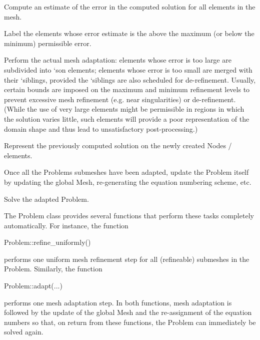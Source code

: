 \begin{DoxyEnumerate}
\item Compute an estimate of the error in the computed solution for all elements in the mesh.
\item Label the elements whose error estimate is the above the maximum (or below the minimum) permissible error.
\item Perform the actual mesh adaptation\+: elements whose error is too large are subdivided into `son\textquotesingle{} elements; elements whose error is too small are merged with their `siblings\textquotesingle{}, provided the `siblings\textquotesingle{} are also scheduled for de-\/refinement. Usually, certain bounds are imposed on the maximum and minimum refinement levels to prevent excessive mesh refinement (e.\+g. near singularities) or de-\/refinement. (While the use of very large elements might be permissible in regions in which the solution varies little, such elements will provide a poor representation of the domain shape and thus lead to unsatisfactory post-\/processing.)
\item Represent the previously computed solution on the newly created {\ttfamily Nodes} / elements.
\item Once all the {\ttfamily Problem\textquotesingle{}s} submeshes have been adapted, update the {\ttfamily Problem} itself by updating the global {\ttfamily Mesh}, re-\/generating the equation numbering scheme, etc.
\item Solve the adapted {\ttfamily Problem}.
\end{DoxyEnumerate}

The {\ttfamily Problem} class provides several functions that perform these tasks completely automatically. For instance, the function 
\begin{DoxyCode}
Problem::refine\_uniformly() 
\end{DoxyCode}
 performs one uniform mesh refinement step for all (refineable) submeshes in the {\ttfamily Problem}. Similarly, the function 
\begin{DoxyCode}
Problem::adapt(...) 
\end{DoxyCode}
 performs one mesh adaptation step. In both functions, mesh adaptation is followed by the update of the global {\ttfamily Mesh} and the re-\/assignment of the equation numbers so that, on return from these functions, the {\ttfamily Problem} can immediately be solved again.

